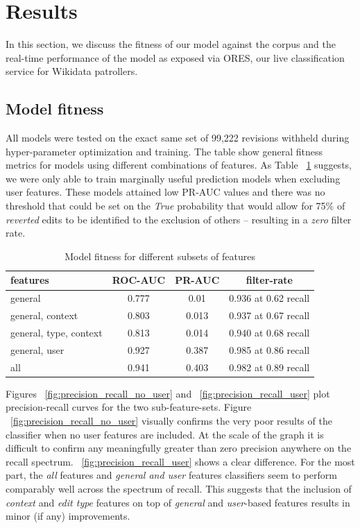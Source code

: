 \documentclass{sig-alternate-2013}
\begin{document}
\section{Results}
In this section, we discuss the fitness of our model against the corpus and the real-time performance of the model as exposed via ORES, our live classification service for Wikidata patrollers.
\subsection{Model fitness}
All models were tested on the exact same set of 99,222 revisions withheld during hyper-parameter optimization and training.  The table show general fitness metrics for models using different combinations of features.  As Table ~\ref{tab:model_fitness} suggests, we were only able to train marginally useful prediction models when excluding user features.  These models attained low PR-AUC values and there was no threshold that could be set on the \textit{True} probability that would allow for 75\% of \textit{reverted} edits to be identified to the exclusion of others -- resulting in a \textit{zero} filter rate.

\begin{table}
\centering
\caption{Model fitness for different subsets of features}
\label{tab:model_fitness}
\begin{tabular}{l|c|c|c} \hline
features & ROC-AUC & PR-AUC & filter-rate \\ \hline
general & 0.777 & 0.01 & 0.936 at 0.62 recall \\  \hline
general, context & 0.803 & 0.013 & 0.937 at 0.67 recall \\  \hline
general, type, context & 0.813 & 0.014 & 0.940 at 0.68 recall \\  \hline
general, user & 0.927 & 0.387 & 0.985 at 0.86 recall \\  \hline
all & 0.941 & 0.403 & 0.982 at 0.89 recall \\  \hline
\end{tabular}
\end{table}

Figures ~\ref{fig:precision_recall_no_user} and ~\ref{fig:precision_recall_user} plot precision-recall curves for the two sub-feature-sets. Figure ~\ref{fig:precision_recall_no_user} visually confirms the very poor results of the classifier when no user features are included.  At the scale of the graph it is difficult to confirm any meaningfully greater than zero precision anywhere on the recall spectrum. ~\ref{fig:precision_recall_user} shows a clear difference.  For the most part, the \textit{all} features and \textit{general and user} features classifiers seem to perform comparably well across the spectrum of recall.  This suggests that the inclusion of \textit{context} and \textit{edit type} features on top of \textit{general} and \textit{user}-based features results in minor (if any) improvements.
\end{document}
